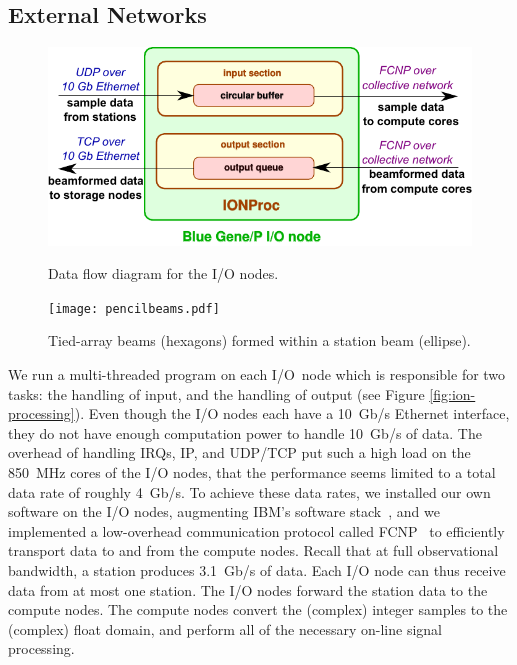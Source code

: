 \documentclass{llncs}
\begin{document}
\subsection{External Networks}
\label{Sec:Networks}

\begin{figure}[ht]
\begin{minipage}[t]{0.47\textwidth}
\includegraphics[width=\textwidth]{ION-processing.pdf}
\caption{Data flow diagram for the I/O nodes.}
\label{fig:ion-processing}
\end{minipage}
\hfill
\begin{minipage}[t]{0.3\textwidth}
\center
\texttt{[image: pencilbeams.pdf]}
\caption{Tied-array beams (hexagons) formed within a station beam (ellipse).}
\label{fig:pencilbeams}
\end{minipage}
\end{figure}


We run a multi-threaded program on each I/O~node which is responsible for two tasks: the handling of input, and the handling of output (see Figure \ref{fig:ion-processing}). Even though the I/O nodes each have a 10~Gb/s Ethernet interface, they do not have enough computation power to handle 10~Gb/s of data. The overhead of handling IRQs, IP, and UDP/TCP put such a high load on the 850~MHz cores of the I/O nodes, that the performance seems limited to a total data rate of roughly 4~Gb/s. To achieve these data rates, we installed our own software on the I/O nodes, augmenting IBM's software stack~\cite{Yoshii:10}, and we implemented a low-overhead communication protocol called FCNP~\cite{Romein:09a} to efficiently transport data to and from the compute nodes. Recall that at full observational bandwidth, a station produces 3.1~Gb/s of data. Each I/O node can thus receive data from at most one station. The I/O nodes forward the station data to the compute nodes. The compute nodes convert the (complex) integer samples to the (complex) float domain, and perform all of the necessary on-line signal processing.
\end{document}
